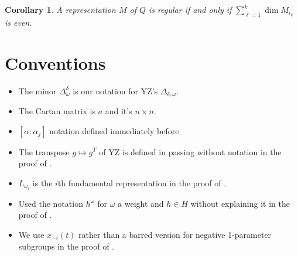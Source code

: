 \documentclass[11pt]{amsart}
\newtheorem{corollary}[theorem]{Corollary}
\begin{document}
  \begin{corollary}
    A representation $M$ of $Q$ is regular if and only if $\sum\limits_{\ell=1}^k\dim M_{i_k}$ is even.
  \end{corollary}

\section{Conventions}

\begin{itemize}
\item The minor $\Delta_\omega^\delta$ is our notation for YZ's $\Delta_{\delta, \omega}$.
\item The Cartan matrix is $a$ and it's $n \times n$.
\item $[\alpha:\alpha_j]$ notation defined immediately before 
\item The transpose $g \mapsto g^T$ of YZ is defined in passing without notation in the proof of .
\item $L_{\omega_i}$ is the $i$th fundamental representation in the proof of .
\item Used the notation $h^\omega$ for $\omega$ a weight and $h \in H$ without explaining it in the proof of .
\item We use $x_{-i}(t)$ rather than a barred version for negative 1-parameter subgroups in the proof of .
\end{itemize}
\end{document}
